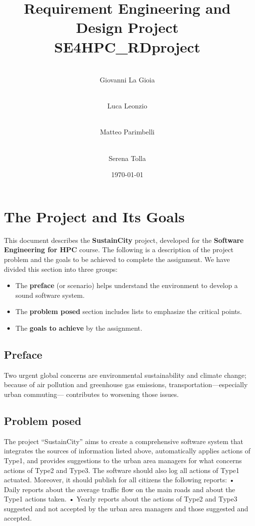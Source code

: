 \documentclass[a4paper,12pt]{article}
\title{Requirement Engineering and Design Project \\ SE4HPC_RDproject}
\author[1]{\\Giovanni La Gioia}
\author[2]{\\Luca Leonzio}
\author[3]{\\Matteo Parimbelli}
\author[4]{\\Serena Tolla}
\affil[1,2,3,4]{Politecnico di Milano}
\date{\today}
\begin{document}
\newpage
\tableofcontents
\clearpage
\newpage

\section{The Project and Its Goals}
This document describes the \textbf{SustainCity} project, developed for the \textbf{Software Engineering for HPC} course.  The following is a description of the project problem and the goals to be achieved to complete the assignment. We have divided this section into three groups:
    \begin{itemize}
        \item The \textbf{preface} (or scenario) helps understand the environment to develop a sound software system.

        \item The \textbf{problem posed} section includes lists to emphasize the critical points.

        \item The \textbf{goals to achieve} by the assignment.
    \end{itemize}

\subsection{Preface}

   Two urgent global concerns are environmental sustainability and climate change; because of 
air pollution and greenhouse gas emissions, transportation—especially urban commuting—
 contributes to worsening those issues. 

\subsection{Problem posed}
The project “SustainCity” aims to create a comprehensive software system that integrates 
the sources of information listed above, automatically applies actions of Type1, and provides 
suggestions to the urban area managers for what concerns actions of Type2 and Type3. The 
software should also log all actions of Type1 actuated. Moreover, it should publish for all 
citizens the following reports:  
• Daily reports about the average traffic flow on the main roads and about the Type1 
actions taken.  
• Yearly reports about the actions of Type2 and Type3 suggested and not accepted by 
the urban area managers and those suggested and accepted. 
\end{document}
